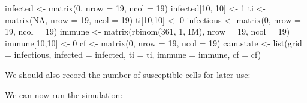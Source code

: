 \documentclass[
  12pt,
  a4paper]{book}
\newenvironment{Shaded}{\begin{snugshade}}{\end{snugshade}}
\newcommand{\AttributeTok}[1]{\textcolor[rgb]{0.77,0.63,0.00}{#1}}
\newcommand{\ConstantTok}[1]{\textcolor[rgb]{0.00,0.00,0.00}{#1}}
\newcommand{\DecValTok}[1]{\textcolor[rgb]{0.00,0.00,0.81}{#1}}
\newcommand{\FunctionTok}[1]{\textcolor[rgb]{0.00,0.00,0.00}{#1}}
\newcommand{\NormalTok}[1]{#1}
\newcommand{\OtherTok}[1]{\textcolor[rgb]{0.56,0.35,0.01}{#1}}
\newcommand{\SpecialCharTok}[1]{\textcolor[rgb]{0.00,0.00,0.00}{#1}}
\begin{document}
\begin{Shaded}
\begin{Highlighting}[]
\NormalTok{infected }\OtherTok{\textless{}{-}} \FunctionTok{matrix}\NormalTok{(}\DecValTok{0}\NormalTok{, }\AttributeTok{nrow =} \DecValTok{19}\NormalTok{, }\AttributeTok{ncol =} \DecValTok{19}\NormalTok{)}
\NormalTok{infected[}\DecValTok{10}\NormalTok{, }\DecValTok{10}\NormalTok{] }\OtherTok{\textless{}{-}} \DecValTok{1}
\NormalTok{ti }\OtherTok{\textless{}{-}} \FunctionTok{matrix}\NormalTok{(}\ConstantTok{NA}\NormalTok{, }\AttributeTok{nrow =} \DecValTok{19}\NormalTok{, }\AttributeTok{ncol =} \DecValTok{19}\NormalTok{)}
\NormalTok{ti[}\DecValTok{10}\NormalTok{,}\DecValTok{10}\NormalTok{] }\OtherTok{\textless{}{-}} \DecValTok{0}
\NormalTok{infectious }\OtherTok{\textless{}{-}} \FunctionTok{matrix}\NormalTok{(}\DecValTok{0}\NormalTok{, }\AttributeTok{nrow =} \DecValTok{19}\NormalTok{, }\AttributeTok{ncol =} \DecValTok{19}\NormalTok{)}
\NormalTok{immune }\OtherTok{\textless{}{-}} \FunctionTok{matrix}\NormalTok{(}\FunctionTok{rbinom}\NormalTok{(}\DecValTok{361}\NormalTok{, }\DecValTok{1}\NormalTok{, IM), }\AttributeTok{nrow =} \DecValTok{19}\NormalTok{, }\AttributeTok{ncol =} \DecValTok{19}\NormalTok{)}
\NormalTok{immune[}\DecValTok{10}\NormalTok{,}\DecValTok{10}\NormalTok{] }\OtherTok{\textless{}{-}} \DecValTok{0}
\NormalTok{cf }\OtherTok{\textless{}{-}} \FunctionTok{matrix}\NormalTok{(}\DecValTok{0}\NormalTok{, }\AttributeTok{nrow =} \DecValTok{19}\NormalTok{, }\AttributeTok{ncol =} \DecValTok{19}\NormalTok{)}
\NormalTok{cam.state }\OtherTok{\textless{}{-}}  \FunctionTok{list}\NormalTok{(}\AttributeTok{grid =}\NormalTok{ infectious, }\AttributeTok{infected =}\NormalTok{ infected, }\AttributeTok{ti =}\NormalTok{ ti,}
                   \AttributeTok{immune =}\NormalTok{ immune, }\AttributeTok{cf =}\NormalTok{ cf)}
\end{Highlighting}
\end{Shaded}

We should also record the number of susceptible cells for later use:

\begin{Shaded}
\end{Shaded}

We can now run the simulation:
\end{document}
